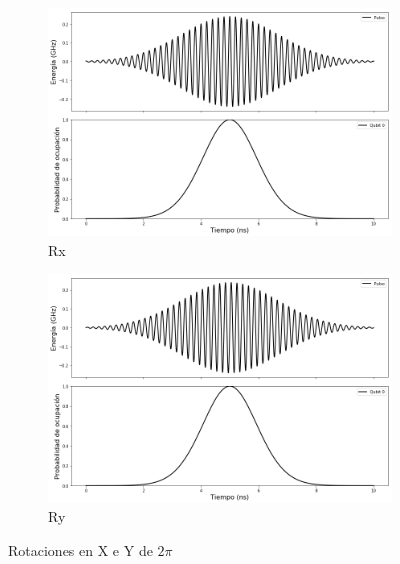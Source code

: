 \begin{figure}[H]
    \centering
    \begin{subfigure}[m]{0.49\textwidth}
        \centering \includegraphics[width=1\linewidth]{img/rx02pi.png}
        \caption{Rx}
    \end{subfigure}
    \begin{subfigure}[m]{0.49\textwidth}
        \centering \includegraphics[width=1\linewidth]{img/ry02pi.png}
        \caption{Ry}
    \end{subfigure}
    \caption[Rotaciones en X e Y de $2\pi$]{Rotaciones en X e Y de $2\pi$}
\label{fig:rxry02pi}
\end{figure}


